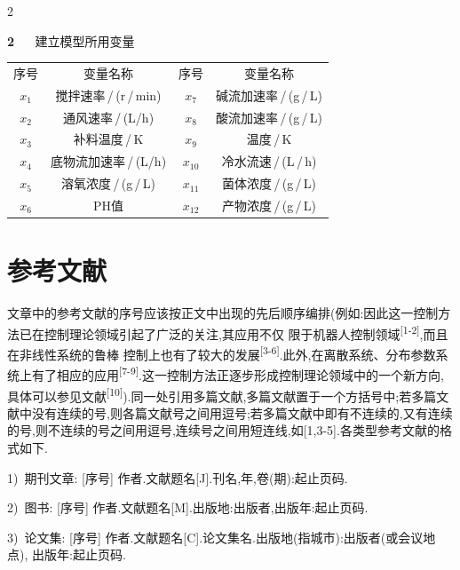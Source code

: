 \documentclass[authordraft]{ctacn}%
\begin{document}
\begin{multicols}{2}

\begin{center}
	{{\heiti{}\tablename\textbf{2}~\,~~建立模型所用变量}\vspace{5pt}}
	
	\renewcommand\tabcolsep{7pt}
	{\fontsize{7.5pt}{11.6pt}\selectfont
		\begin{tabular}{cc||cc}\bottomrule
			序号  &       变量名称 &       序号 &                 变量名称 \\\hhline{--||--}
			$x_1$  &       搅拌速率\,/\,(r\,/\,min)   &   $x_7$  &      碱流加速率\,/\,(g\,/\,L)       \\	
			$x_2$  &       通风速率\,/\,(L/h)     &   $x_8$  &      酸流加速率\,/\,(g\,/\,L)       \\	
			$x_3$  &       补料温度\,/\,K       &   $x_9$  &       温度\,/\,K\\	
			$x_4$  &       底物流加速率\,/\,(L/h) &  ${x_{10}}$  &       冷水流速\,/\,(L\,/\,h)\\
			$x_5$  &        溶氧浓度\,/\,(g\,/\,L)     &  ${x_{11}}$  &       菌体浓度\,/\,(g\,/\,L)\\
			$x_6$  &        PH值              &  ${x_{12}}$  &       产物浓度\,/\,(g\,/\,L)\\[-2pt]
			\bottomrule
	\end{tabular}}
\end{center}

\section{参考文献}
文章中的参考文献的序号应该按正文中出现的先后顺序编排(例如:因此这一控制方法已在控制理论领域引起了广泛的关注,其应用不仅
限于机器人控制领域\textsuperscript{[1-2]},而且在非线性系统的鲁棒
控制上也有了较大的发展\textsuperscript{[3-6]}.\;此外,在离散系统、分布参数系统上有了相应的应用\textsuperscript{[7-9]}.\;这一控制方法正逐步形成控制理论领域中的一个新方向,具体可以参见文献\textsuperscript{[10]}).\;同一处引用多篇文献,多篇文献置于一个方括号中;若多篇文献中没有连续的号,则各篇文献号之间用逗号;若多篇文献中即有不连续的,又有连续的号,则不连续的号之间用逗号,连续号之间用短连线,如[1,3-5].\;各类型参考文献的格式如下.

1)~期刊文章:
[序号] 作者.\;文献题名[J].\;刊名,年,卷(期):起止页码.


2)~图书:
[序号] 作者.\;文献题名[M].\;出版地:出版者,出版年:起止页码.

3)~论文集:
[序号] 作者.\;文献题名[C].\;论文集名.\;出版地(指城市):出版者(或会议地点), 出版年:起止页码.


\end{multicols}
\end{document}
